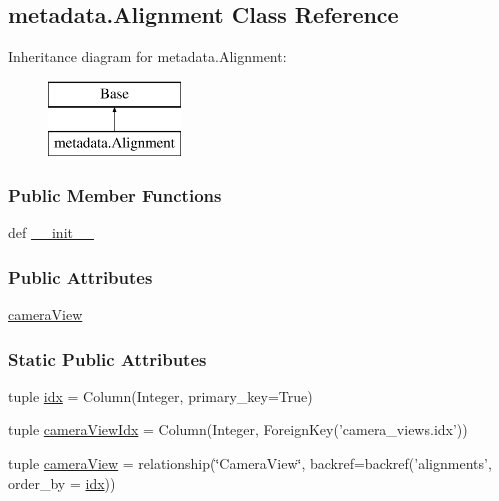\hypertarget{classmetadata_1_1Alignment}{\subsection{metadata.\-Alignment Class Reference}
\label{classmetadata_1_1Alignment}
}
Inheritance diagram for metadata.\-Alignment\-:\begin{figure}[H]
\begin{center}
\leavevmode
\includegraphics[height=2.000000cm]{classmetadata_1_1Alignment}
\end{center}
\end{figure}
\subsubsection*{Public Member Functions}
\begin{DoxyCompactItemize}
\item 
def \hyperlink{classmetadata_1_1Alignment_a167380dd62ad57520e11cbc05891a77f}{\-\_\-\-\_\-init\-\_\-\-\_\-}
\end{DoxyCompactItemize}
\subsubsection*{Public Attributes}
\begin{DoxyCompactItemize}
\item 
\hyperlink{classmetadata_1_1Alignment_a9e23763abf24ef8b40b62776f0d088fd}{camera\-View}
\end{DoxyCompactItemize}
\subsubsection*{Static Public Attributes}
\begin{DoxyCompactItemize}
\item 
tuple \hyperlink{classmetadata_1_1Alignment_aefc5837250a62d76466899e8720044b5}{idx} = Column(Integer, primary\-\_\-key=True)
\item 
tuple \hyperlink{classmetadata_1_1Alignment_aad17a6114e7cd9602aa7cd297cd7465e}{camera\-View\-Idx} = Column(Integer, Foreign\-Key('camera\-\_\-views.\-idx'))
\item 
tuple \hyperlink{classmetadata_1_1Alignment_a598b4395f5de4eb2ba5fb4fa4f3949da}{camera\-View} = relationship(\char`\"{}Camera\-View\char`\"{}, backref=backref('alignments', order\-\_\-by = \hyperlink{classmetadata_1_1Alignment_aefc5837250a62d76466899e8720044b5}{idx}))
\end{DoxyCompactItemize}


